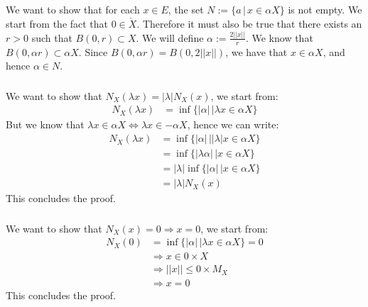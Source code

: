 \documentclass{article}
\begin{document}
\subsection{}%
\subsubsection{}%

We want to show that for each $x \in E$, the set $N := \{a\,|\, x \in \alpha X\}$ is not empty. We start from the fact that $0 \in \mathring{X}$. Therefore it must also be true that there exists an $r > 0$ such that $B(0,r) \subset X$. We will define $\alpha := \frac{2||x||}{r}$. We know that $B(0,\alpha r) \subset \alpha X$. Since $B(0, \alpha r) = B(0, 2||x||)$, we have that $x \in \alpha X$, and hence $\alpha \in N$.

\subsubsection{}%

We want to show that $N_X(\lambda x) = |\lambda|N_X(x)$, we start from:
\begin{align*}
	N_X(\lambda x) &= \inf\{|\alpha | \, | \lambda x \in \alpha X\}
\end{align*}
But we know that $\lambda x \in \alpha X \Leftrightarrow \lambda x \in -\alpha X$, hence we can write:
\begin{align*}
	N_X(\lambda x) &= \inf\{|\alpha | \, | |\lambda| x \in \alpha X\}\\
	&= \inf\{|\lambda \alpha | \, | x \in \alpha X\}\\
	&= |\lambda|\inf\{|\alpha | \, | x \in \alpha X\}\\
	&= |\lambda|N_X(x)
\end{align*}
This concludes the proof.
\subsubsection{}%
We want to show that $N_X(x) = 0 \Rightarrow x=0$, we start from:
\begin{align*}
	N_X(0) &= \inf\{|\alpha | \, | \lambda x \in \alpha X\} = 0\\
	&\Rightarrow x \in 0 \times X\\
	&\Rightarrow ||x|| \leq 0 \times M_X\\
	&\Rightarrow x = 0
\end{align*}
This concludes the proof.
\end{document}

